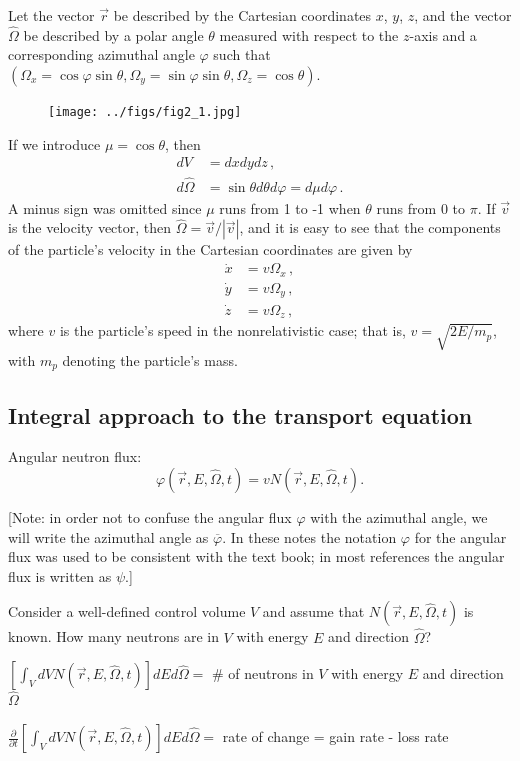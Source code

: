 \documentclass[12pt]{article}
\newcommand{\rvec}{\ensuremath{\vec{r}}}
\newcommand{\omvec}{\ensuremath{\hat{\Omega}}}
\begin{document}
 Let the vector $\rvec$ be described by the Cartesian coordinates $x$, $y$, $z$, and the vector
$\omvec$ be described by a polar angle $\theta$ measured with respect to the $z$-axis
 and a corresponding azimuthal angle $\varphi$ such that $(\Omega_x=\cos\varphi \sin\theta, \Omega_y = \sin\varphi \sin\theta, \Omega_z = \cos\theta)$.
\begin{figure}%
\texttt{[image: ../figs/fig2\_1.jpg]}
\end{figure}
 If we introduce $\mu = \cos\theta$, then
\begin{align*}
dV &= dxdydz\,,
\\
d\omvec &=  \sin\theta d\theta d\varphi = d\mu d\varphi\,. 
\end{align*}
A minus sign was omitted since $\mu$ runs from
1 to -1 when $\theta$ runs from 0 to $\pi$.
If $\vec{v}$ is the velocity vector, then $\omvec = \vec{v}/{|\vec{v}|}$,
and
it is easy to see that the components of the particle's velocity in the Cartesian
coordinates are given by
\begin{align*}
\dot x &=  v\Omega_x\,,\\
\dot y &=  v\Omega_y\,,\\
\dot z &=  v\Omega_z\,,
\end{align*}
 where $v$ is the particle's speed in the nonrelativistic case; that is, $v = \sqrt{2E/m_p}$, with $m_p$
denoting the particle's mass.

\subsection*{Integral approach to the transport equation}

Angular neutron flux:
\[
\varphi(\rvec, E, \omvec, t)=vN(\rvec, E, \omvec, t).
\] 

[Note: in order not to confuse the angular flux $\varphi$ with the azimuthal angle, we will write the azimuthal angle as $\overline{\varphi}$. In these notes the notation $\varphi$ for the angular flux was used to be consistent with the text book; in most references the angular flux is written as $\psi$.]

Consider a well-defined control volume $V$ and assume that $N(\rvec, E, \omvec, t)$ is known. How many neutrons are in $V$ with energy $E$ and direction $\omvec$?

$\left[\int_V dV N(\rvec, E, \omvec, t)\right] dEd\omvec =$ \# of neutrons in $V$ with energy $E$ and direction $\omvec$

$\frac{\partial}{\partial t}\left[\int_V dV N(\rvec, E, \omvec, t)\right] dEd\omvec =$ rate of change  = gain rate - loss rate
\end{document}
